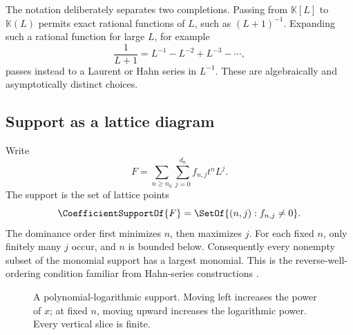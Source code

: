 \documentclass[11pt]{article}
\theoremstyle{pltheorem}
\newcommand{\K}{\mathbb K}
\begin{document}
The notation deliberately separates two completions.  Passing from \(\K[L]\) to \(\K(L)\) permits exact rational functions of \(L\), such as \((L+1)^{-1}\).  Expanding such a rational function for large \(L\), for example
\[
 \frac1{L+1}=L^{-1}-L^{-2}+L^{-3}-\cdots,
\]
passes instead to a Laurent or Hahn series in \(L^{-1}\).  These are algebraically and asymptotically distinct choices.

\subsection{Support as a lattice diagram}

Write
\begin{equation}\label{eq:double-coeff-form}
 F=\sum_{n\ge n_0}\sum_{j=0}^{d_n}f_{n,j}t^nL^j.
\end{equation}
The support is the set of lattice points
\[
 \CoefficientSupportOf{F}=\SetOf{(n,j):f_{n,j}\ne0}.
\]
The dominance order first minimizes \(n\), then maximizes \(j\).  For each fixed \(n\), only finitely many \(j\) occur, and \(n\) is bounded below.  Consequently every nonempty subset of the monomial support has a largest monomial.  This is the reverse-well-ordering condition familiar from Hahn-series constructions \cite{hahn,edgar-beginners}.

\begin{figure}[htbp]
\centering
{}
\caption{A polynomial-logarithmic support.  Moving left increases the power of \(x\); at fixed \(n\), moving upward increases the logarithmic power.  Every vertical slice is finite.}
\label{fig:support-lattice}
\end{figure}
\end{document}
